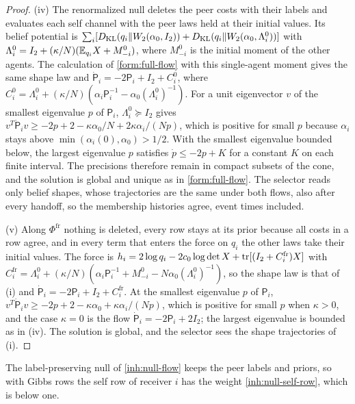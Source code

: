 \begin{proof}
(iv) The renormalized null deletes the peer costs with their labels and evaluates each self channel with the peer laws held at their initial values. Its belief potential is $\sum_i[D_{\mathrm{KL}}(q_i\Vert W_2(\alpha_0,I_2))+D_{\mathrm{KL}}(q_i\Vert W_2(\alpha_0,\Lambda_i^0))]$ with $\Lambda_i^0=I_2+(\kappa/N)(\mathbb E_{q_i}X+M_{-i}^0)$, where $M_{-i}^0$ is the initial moment of the other agents. The calculation of \cref{form:full-flow} with this single-agent moment gives the same shape law and $\dot{\mathsf P}_i=-2\mathsf P_i+I_2+C_i^0$, where $C_i^0=\Lambda_i^0+(\kappa/N)(\alpha_i\mathsf P_i^{-1}-\alpha_0(\Lambda_i^0)^{-1})$. For a unit eigenvector $v$ of the smallest eigenvalue $p$ of $\mathsf P_i$, $\Lambda_i^0\succeq I_2$ gives $v^T\dot{\mathsf P}_iv\ge-2p+2-\kappa\alpha_0/N+2\kappa\alpha_i/(Np)$, which is positive for small $p$ because $\alpha_i$ stays above $\min(\alpha_i(0),\alpha_0)>1/2$. With the smallest eigenvalue bounded below, the largest eigenvalue $p$ satisfies $\dot p\le-2p+K$ for a constant $K$ on each finite interval. The precisions therefore remain in compact subsets of the cone, and the solution is global and unique as in \cref{form:full-flow}. The selector reads only belief shapes, whose trajectories are the same under both flows, also after every handoff, so the membership histories agree, event times included.

(v) Along $\Phi^{\mathrm{fr}}$ nothing is deleted, every row stays at its prior because all costs in a row agree, and in every term that enters the force on $q_i$ the other laws take their initial values. The force is $h_i=2\log q_i-2c_0\log\det X+\operatorname{tr}[(I_2+C_i^{\mathrm{fr}})X]$ with $C_i^{\mathrm{fr}}=\Lambda_i^0+(\kappa/N)(\alpha_i\mathsf P_i^{-1}+M_{-i}^0-N\alpha_0(\Lambda_i^0)^{-1})$, so the shape law is that of (i) and $\dot{\mathsf P}_i=-2\mathsf P_i+I_2+C_i^{\mathrm{fr}}$. At the smallest eigenvalue $p$ of $\mathsf P_i$, $v^T\dot{\mathsf P}_iv\ge-2p+2-\kappa\alpha_0+\kappa\alpha_i/(Np)$, which is positive for small $p$ when $\kappa>0$, and the case $\kappa=0$ is the flow $\dot{\mathsf P}_i=-2\mathsf P_i+2I_2$; the largest eigenvalue is bounded as in (iv). The solution is global, and the selector sees the shape trajectories of (i).
\end{proof}

The label-preserving null of \cref{inh:null-flow} keeps the peer labels and priors, so with Gibbs rows the self row of receiver $i$ has the weight \cref{inh:null-self-row}, which is below one.

